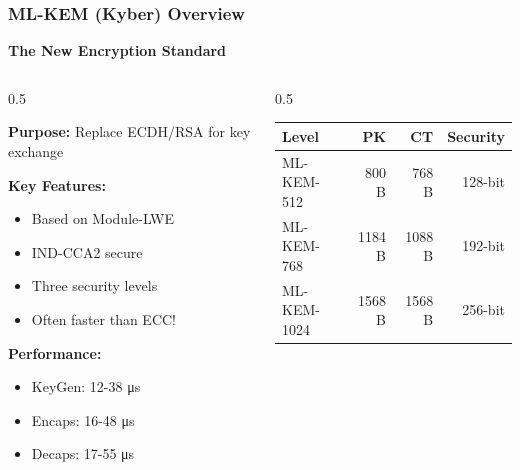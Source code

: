 \documentclass[aspectratio=169,10pt]{beamer}
\newcommand{\slideheader}[1]{\frametitle{#1}}
\theoremstyle{plain}
\begin{document}
\begin{frame}
  \slideheader{ML-KEM (Kyber) Overview}
  
  \begin{center}
    \textbf{\large The New Encryption Standard}
  \end{center}
  
  \vspace{0.3cm}
  
  \begin{columns}[T]
    \begin{column}{0.5\textwidth}

    \textbf{Purpose:} Replace ECDH/RSA for key exchange
    
    \vspace{0.3cm}
    
    \textbf{Key Features:}
    \begin{itemize}
      \item Based on Module-LWE
      \item IND-CCA2 secure
      \item Three security levels
      \item Often faster than ECC!
    \end{itemize}
    
    \vspace{0.3cm}
    
    \textbf{Performance:}
    \begin{itemize}
      \item KeyGen: 12-38 μs
      \item Encaps: 16-48 μs
      \item Decaps: 17-55 μs
    \end{itemize}
  
    \end{column}
    \begin{column}{0.5\textwidth}

    \begin{tabular}{|l|r|r|r|}
      \hline
      \textbf{Level} & \textbf{PK} & \textbf{CT} & \textbf{Security} \\
      \hline
      ML-KEM-512 & 800 B & 768 B & 128-bit \\
      ML-KEM-768 & 1184 B & 1088 B & 192-bit \\
      ML-KEM-1024 & 1568 B & 1568 B & 256-bit \\
      \hline
    \end{tabular}
    
    \vspace{0.5cm}
    

\end{column}
\end{columns}
\end{frame}
\end{document}

